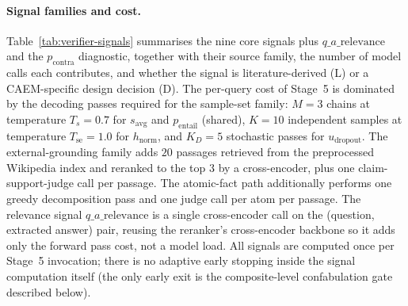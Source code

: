 \paragraph{Signal families and cost.}
Table~\ref{tab:verifier-signals} summarises the nine core signals plus $q\_a\_\text{relevance}$ and the $p_{\text{contra}}$ diagnostic, together with their source family, the number of model calls each contributes, and whether the signal is literature-derived (L) or a CAEM-specific design decision (D). The per-query cost of Stage~5 is dominated by the decoding passes required for the sample-set family: $M = 3$ chains at temperature $T_s = 0.7$ for $s_{\text{avg}}$ and $p_{\text{entail}}$ (shared), $K = 10$ independent samples at temperature $T_{\text{se}} = 1.0$ for $h_{\text{norm}}$, and $K_{D} = 5$ stochastic passes for $u_{\text{dropout}}$. The external-grounding family adds $20$ passages retrieved from the preprocessed Wikipedia index and reranked to the top $3$ by a cross-encoder, plus one claim-support-judge call per passage. The atomic-fact path additionally performs one greedy decomposition pass and one judge call per atom per passage. The relevance signal $q\_a\_\text{relevance}$ is a single cross-encoder call on the (question, extracted answer) pair, reusing the reranker's cross-encoder backbone so it adds only the forward pass cost, not a model load. All signals are computed once per Stage~5 invocation; there is no adaptive early stopping inside the signal computation itself (the only early exit is the composite-level confabulation gate described below).

